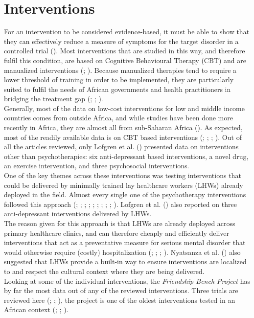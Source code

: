 \documentclass[stu,a4paper,12pt,donotrepeattitle]{apa7}
\begin{document}
\section{Interventions}
For an intervention to be considered evidence-based, it must be able to show
that they can effectively reduce a measure of symptoms for the target disorder
in a controlled trial (\cite{cook17}). Most interventions that are studied in
this way, and therefore fulfil this condition, are based on Cognitive
Behavioural Therapy (CBT) and are manualized interventions
(\cite{cook17}; \cite{shed18}). Because manualized therapies tend to require a
lower threshold of training in order to be implemented, they are particularly
suited to fulfil the needs of African governments and health practitioners in
bridging the treatment gap (\cite{cook17}; \cite{douketal21}; \cite{lunetal14}).\\
Generally, most of the data on low-cost interventions for low and middle income
countries comes from outside Africa, and while studies have been done more
recently in Africa, they are almost all from sub-Saharan Africa
(\cite{logetal18}). As expected, most of the readily available data is on
CBT based interventions (\cite{chibandaetal11}; \cite{fernaetal21};
\cite{logetal18}; \cite{lunetal14}). Out of all the articles reviewed, only
Lofgren et al. (\citeyear{logetal18}) presented data on interventions other than
psychotherapies: six anti-depressant based interventions, a novel drug, an
exercise intervention, and three psychosocial interventions.\\
One of the key themes across these interventions was testing interventions that
could be delivered by minimally trained lay healthcare workers (LHWs) already
deployed in the field. Almost every single one of the psychotherapy interventions
followed this approach (\cite{abasetal16}; \cite{chibandaetal11};
\cite{chibandaetal15}; \cite{chibandaetal16}; \cite{douketal21};
\cite{fernaetal21}; \cite{logetal18}; \cite{lunetal14}; \cite{nyatetal16};
\cite{petersenetal14}). Lofgren et al. (\citeyear{logetal18}) also reported on
three anti-depressant interventions delivered by LHWs.\\
The reason given for this approach is that LHWs are already deployed across
primary healthcare clinics, and can therefore cheaply and efficiently deliver
interventions that act as a preventative measure for serious mental disorder
that would otherwise require (costly) hospitalization (\cite{abasetal16};
\cite{douketal21}; \cite{fernaetal21}; \cite{lunetal14}). Nyatsanza et al.
(\citeyear{nyatetal16}) also suggested that LHWs provide a built-in way to
ensure interventions are localized to and respect the cultural context where
they are being delivered.\\
Looking at some of the individual interventions, the \textit{Friendship Bench
Project} has by far the most data out of any of the reviewed interventions.
Three trials are reviewed here (\cite{chibandaetal11}; \cite{chibandaetal15};
\cite{fernaetal21}), the project is one of the oldest interventions tested in
an African context (\cite{abasal16}; \cite{chibandaetal11}; \cite{fernaetal21}).
\end{document}
